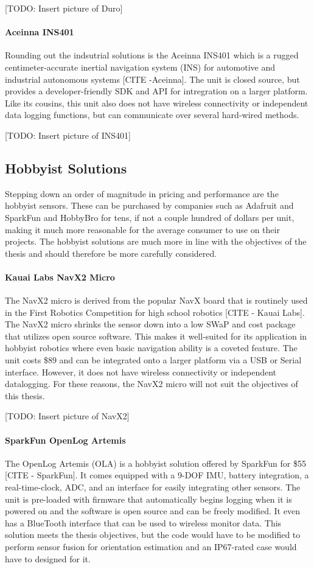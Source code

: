 [TODO: Insert picture of Duro]

\paragraph*{Aceinna INS401} Rounding out the indsutrial solutions is the Aceinna INS401 which is a rugged centimeter-accurate inertial navigation system (INS) for automotive and industrial autonomous systems [CITE -Aceinna].
The unit is closed source, but provides a developer-friendly SDK and API for intregration on a larger platform.
Like its cousins, this unit also does not have wireless connectivity or independent data logging functions, but can communicate over several hard-wired methods.

[TODO: Insert picture of INS401]

\subsection{Hobbyist Solutions}
Stepping down an order of magnitude in pricing and performance are the hobbyist sensors.
These can be purchased by companies such as Adafruit and SparkFun and HobbyBro for tens, if not a couple hundred of dollars per unit, making it much more reasonable for the average consumer to use on their projects.
The hobbyist solutions are much more in line with the objectives of the thesis and should therefore be more carefully considered.

\paragraph*{Kauai Labs NavX2 Micro} The NavX2 micro is derived from the popular NavX board that is routinely used in the First Robotics Competition for high school robotics [CITE - Kauai Labs].
The NavX2 micro shrinks the sensor down into a low SWaP and cost package that utilizes open source software.
This makes it well-suited for its application in hobbyist robotics where even basic navigation ability is a coveted feature.
The unit costs \$89 and can be integrated onto a larger platform via a USB or Serial interface.
However, it does not have wireless connectivity or independent datalogging.
For these reasons, the NavX2 micro will not suit the objectives of this thesis.

[TODO: Insert picture of NavX2]

\paragraph*{SparkFun OpenLog Artemis} The OpenLog Artemis (OLA) is a hobbyist solution offered by SparkFun for \$55 [CITE - SparkFun].
It comes equipped with a 9-DOF IMU, battery integration, a real-time-clock, ADC, and an interface for easily integrating other sensors.
The unit is pre-loaded with firmware that automatically begins logging when it is powered on and the software is open source and can be freely modified.
It even has a BlueTooth interface that can be used to wireless monitor data.
This solution meets the thesis objectives, but the code would have to be modified to perform sensor fusion for orientation estimation and an IP67-rated case would have to designed for it.

